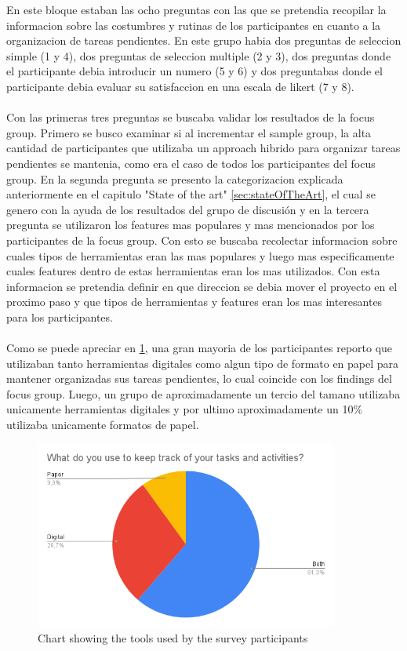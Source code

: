 En este bloque estaban las ocho preguntas con las que se pretendia recopilar la informacion sobre las costumbres y rutinas de los participantes en cuanto a la organizacion de tareas pendientes. En este grupo habia dos preguntas de seleccion simple (1 y 4), dos preguntas de seleccion multiple (2 y 3), dos preguntas donde el participante debia introducir un numero (5 y 6) y dos preguntabas donde el participante debia evaluar su satisfaccion en una escala de likert (7 y 8).\\
\\
Con las primeras tres preguntas se buscaba validar los resultados de la focus group. Primero se busco examinar si al incrementar el sample group, la alta cantidad de participantes que utilizaba un approach hibrido para organizar tareas pendientes se mantenia, como era el caso de todos los participantes del focus group. En la segunda pregunta se presento la categorizacion explicada anteriormente en el capitulo "State of the art" \ref{sec:stateOfTheArt}, el cual se genero con la ayuda de los resultados del grupo de discusión y en la tercera pregunta se utilizaron los features mas populares y mas mencionados por los participantes de la focus group. Con esto se buscaba recolectar informacion sobre cuales tipos de herramientas eran las mas populares y luego mas especificamente cuales features dentro de estas herramientas eran los mas utilizados. Con esta informacion se pretendia definir en que direccion se debia mover el proyecto en el proximo paso y que tipos de herramientas y features eran los mas interesantes para los participantes. \\
\\
Como se puede apreciar en \ref{fig:surveyToolType}, una gran mayoria de los participantes reporto que utilizaban tanto herramientas digitales como algun tipo de formato en papel para mantener organizadas sus tareas pendientes, lo cual coincide con los findings del focus group. Luego, un grupo de aproximadamente un tercio del tamano utilizaba unicamente herramientas digitales y por ultimo aproximadamente un 10\% utilizaba unicamente formatos de papel.

\FloatBarrier
\begin{figure}[!htbp]
    \centering
    \includegraphics[width=10cm]{Images/General/03_user_centered_design/Survey/WhatKeepTrack.png}
    \caption{Chart showing the tools used by the survey participants}
    \label{fig:surveyToolType}
\end{figure}
\FloatBarrier

